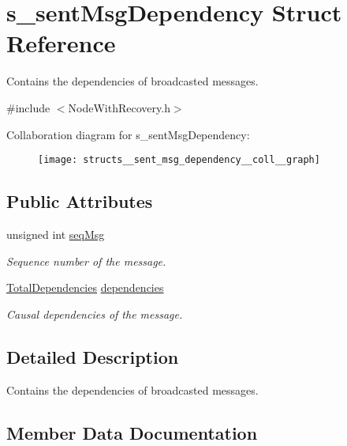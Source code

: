 \hypertarget{structs__sent_msg_dependency}{}\section{s\+\_\+sent\+Msg\+Dependency Struct Reference}
\label{structs__sent_msg_dependency}


Contains the dependencies of broadcasted messages.  




{\ttfamily \#include $<$Node\+With\+Recovery.\+h$>$}



Collaboration diagram for s\+\_\+sent\+Msg\+Dependency\+:\nopagebreak
\begin{figure}[H]
\begin{center}
\leavevmode
\texttt{[image: structs\_\_sent\_msg\_dependency\_\_coll\_\_graph]}
\end{center}
\end{figure}
\subsection*{Public Attributes}
\begin{DoxyCompactItemize}
\item 
unsigned int \hyperlink{structs__sent_msg_dependency_afd3ba2f762d695961fed00fb401bc3e7}{seq\+Msg}
\begin{DoxyCompactList}\small\item\em Sequence number of the message. \end{DoxyCompactList}\item 
\hyperlink{class_total_dependencies}{Total\+Dependencies} \hyperlink{structs__sent_msg_dependency_ab7ece51991fbcba599580914571a32cc}{dependencies}
\begin{DoxyCompactList}\small\item\em Causal dependencies of the message. \end{DoxyCompactList}\end{DoxyCompactItemize}


\subsection{Detailed Description}
Contains the dependencies of broadcasted messages. 

\subsection{Member Data Documentation}
\mbox{\label{structs__sent_msg_dependency_ab7ece51991fbcba599580914571a32cc}} 
